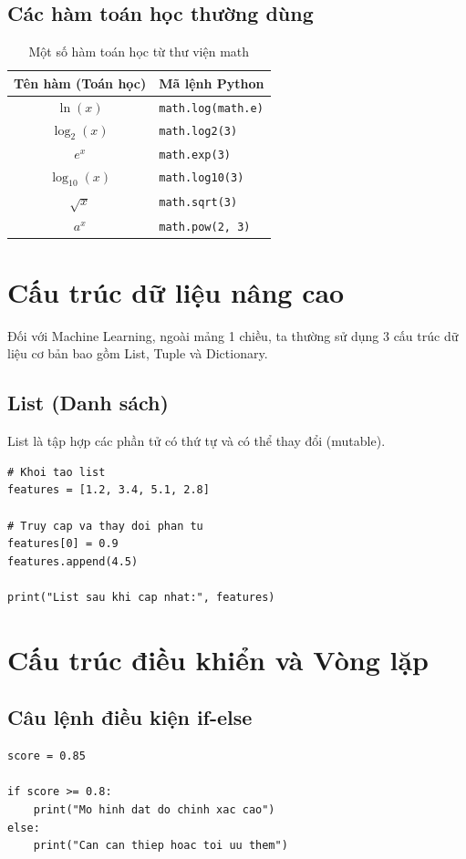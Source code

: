 \subsection{Các hàm toán học thường dùng}
\begin{table}[h]
\centering
\begin{tabular}{|c|l|}
\hline
\textbf{Tên hàm (Toán học)} & \textbf{Mã lệnh Python} \\
\hline
$\ln(x)$ & \texttt{math.log(math.e)} \\
\hline
$\log_2(x)$ & \texttt{math.log2(3)} \\
\hline
$e^x$ & \texttt{math.exp(3)} \\
\hline
$\log_{10}(x)$ & \texttt{math.log10(3)} \\
\hline
$\sqrt{x}$ & \texttt{math.sqrt(3)} \\
\hline
$a^x$ & \texttt{math.pow(2, 3)} \\
\hline
\end{tabular}
\caption{Một số hàm toán học từ thư viện math}
\end{table}

\section{Cấu trúc dữ liệu nâng cao}

Đối với Machine Learning, ngoài mảng 1 chiều, ta thường sử dụng 3 cấu trúc dữ liệu cơ bản bao gồm List, Tuple và Dictionary.

\subsection{List (Danh sách)}
List là tập hợp các phần tử có thứ tự và có thể thay đổi (mutable).

\begin{lstlisting}[caption={Thao tác cơ bản trên List}]
# Khoi tao list
features = [1.2, 3.4, 5.1, 2.8]

# Truy cap va thay doi phan tu
features[0] = 0.9
features.append(4.5)

print("List sau khi cap nhat:", features)
\end{lstlisting}

\section{Cấu trúc điều khiển và Vòng lặp}

\subsection{Câu lệnh điều kiện if-else}
\begin{lstlisting}[caption={Sử dụng cấu trúc điều kiện}]
score = 0.85

if score >= 0.8:
    print("Mo hinh dat do chinh xac cao")
else:
    print("Can can thiep hoac toi uu them")
\end{lstlisting}

